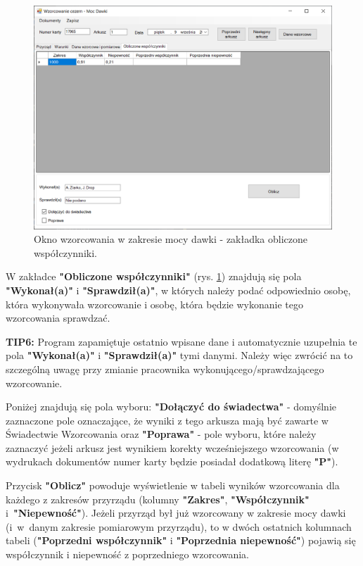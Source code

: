 \begin{figure}[htb]
	\centering
	\includegraphics[width=\columnwidth]{obrazki/Wzorcowanie/moc_dawki/wspolczynniki.png}
	\caption{Okno wzorcowania w zakresie mocy dawki - zakładka obliczone współczynniki.}
	\label{mocWspolczynniki}
\end{figure}

W zakładce \textbf{"Obliczone współczynniki"} (rys. \ref{mocWspolczynniki}) znajdują się pola \textbf{"Wykonał(a)"} i \textbf{"Sprawdził(a)"}, w których należy podać odpowiednio osobę, która wykonywała wzorcowanie i osobę, która będzie wykonanie tego wzorcowania sprawdzać. 

\textbf{TIP6:} Program zapamiętuje ostatnio wpisane dane i automatycznie uzupełnia te pola \textbf{"Wykonał(a)"} i \textbf{"Sprawdził(a)"} tymi danymi. Należy więc zwrócić na to szczególną uwagę przy zmianie pracownika wykonującego/sprawdzającego wzorcowanie.

Poniżej znajdują się pola wyboru: \textbf{"Dołączyć do świadectwa"} - domyślnie zaznaczone pole oznaczające, że wyniki z tego arkusza mają być zawarte w Świadectwie Wzorcowania oraz \textbf{"Poprawa"} - pole wyboru, które należy zaznaczyć jeżeli arkusz jest wynikiem korekty wcześniejszego wzorcowania (w wydrukach dokumentów numer karty będzie posiadał dodatkową literę \textbf{"P"}).

Przycisk \textbf{"Oblicz"} powoduje wyświetlenie w tabeli wyników wzorcowania dla każdego z zakresów przyrządu (kolumny \textbf{"Zakres"}, \textbf{"Współczynnik"} i~\textbf{"Niepewność"}). Jeżeli przyrząd był już wzorcowany w zakresie mocy dawki (i~w~danym zakresie pomiarowym przyrządu), to w dwóch ostatnich kolumnach tabeli (\textbf{"Poprzedni współczynnik"} i \textbf{"Poprzednia niepewność"}) pojawią się współczynnik i niepewność z poprzedniego wzorcowania. 


